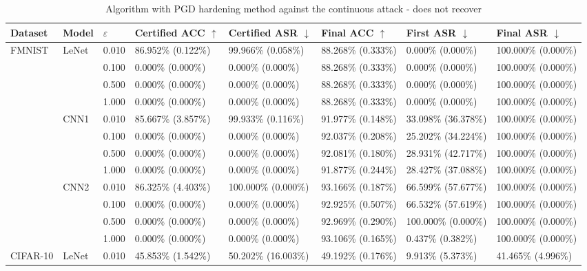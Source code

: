 \documentclass[conference,compsoc]{IEEEtran}
\begin{document}
\begin{landscape}
\begin{table}[H]
\centering
\caption{Algorithm with PGD hardening method against the continuous attack - does not recover}
\begin{tabular}{llllllll}
\hline
\textbf{Dataset} & \textbf{Model} & $\varepsilon$ & \textbf{Certified ACC} $\uparrow$ & \textbf{Certified ASR} $\downarrow$ & \textbf{Final ACC} $\uparrow$ & \textbf{First ASR} $\downarrow$ & \textbf{Final ASR} $\downarrow$ \\
\hline
\multirow{12}{*}{FMNIST} & \multirow{4}{*}{LeNet} & 0.010 & 86.952\% (0.122\%) & 99.966\% (0.058\%) & 88.268\% (0.333\%) & 0.000\% (0.000\%) & 100.000\% (0.000\%) \\
& & 0.100 & 0.000\% (0.000\%) & 0.000\% (0.000\%) & 88.268\% (0.333\%) & 0.000\% (0.000\%) & 100.000\% (0.000\%) \\
& & 0.500 & 0.000\% (0.000\%) & 0.000\% (0.000\%) & 88.268\% (0.333\%) & 0.000\% (0.000\%) & 100.000\% (0.000\%) \\
& & 1.000 & 0.000\% (0.000\%) & 0.000\% (0.000\%) & 88.268\% (0.333\%) & 0.000\% (0.000\%) & 100.000\% (0.000\%) \\
\cline{2-8}
& \multirow{4}{*}{CNN1} & 0.010 & 85.667\% (3.857\%) & 99.933\% (0.116\%) & 91.977\% (0.148\%) & 33.098\% (36.378\%) & 100.000\% (0.000\%) \\
& & 0.100 & 0.000\% (0.000\%) & 0.000\% (0.000\%) & 92.037\% (0.208\%) & 25.202\% (34.224\%) & 100.000\% (0.000\%) \\
& & 0.500 & 0.000\% (0.000\%) & 0.000\% (0.000\%) & 92.081\% (0.180\%) & 28.931\% (42.717\%) & 100.000\% (0.000\%) \\
& & 1.000 & 0.000\% (0.000\%) & 0.000\% (0.000\%) & 91.877\% (0.244\%) & 28.427\% (37.088\%) & 100.000\% (0.000\%) \\
\cline{2-8}
& \multirow{4}{*}{CNN2} & 0.010 & 86.325\% (4.403\%) & 100.000\% (0.000\%) & 93.166\% (0.187\%) & 66.599\% (57.677\%) & 100.000\% (0.000\%) \\
& & 0.100 & 0.000\% (0.000\%) & 0.000\% (0.000\%) & 92.925\% (0.507\%) & 66.532\% (57.619\%) & 100.000\% (0.000\%) \\
& & 0.500 & 0.000\% (0.000\%) & 0.000\% (0.000\%) & 92.969\% (0.290\%) & 100.000\% (0.000\%) & 100.000\% (0.000\%) \\
& & 1.000 & 0.000\% (0.000\%) & 0.000\% (0.000\%) & 93.106\% (0.165\%) & 0.437\% (0.382\%) & 100.000\% (0.000\%) \\
\hline
\multirow{12}{*}{CIFAR-10} & \multirow{4}{*}{LeNet} & 0.010 & 45.853\% (1.542\%) & 50.202\% (16.003\%) & 49.192\% (0.176\%) & 9.913\% (5.373\%) & 41.465\% (4.996\%) \\

\end{tabular}
\end{table}
\end{landscape}
\end{document}
